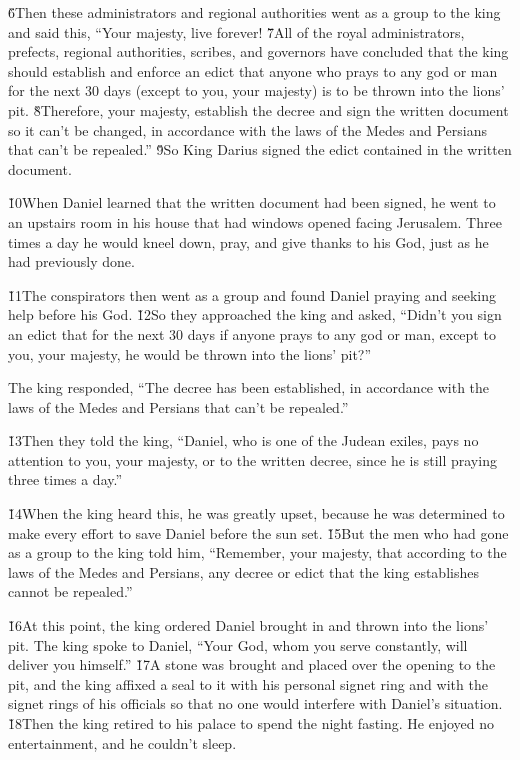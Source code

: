 \v{6}Then these administrators and regional authorities went as a group to the king and said this, ``Your majesty, live forever! \v{7}All of the royal administrators, prefects, regional authorities, scribes, and governors have concluded that the king should establish and enforce an edict that anyone who prays to any god or man for the next 30 days (except to you, your majesty) is to be thrown into the lions' pit. \v{8}Therefore, your majesty, establish the decree and sign the written document so it can't be changed, in accordance with the laws of the Medes and Persians that can't be repealed.'' \v{9}So King Darius signed the edict contained in the written document.

\v{10}When Daniel learned that the written document had been signed, he went to an upstairs room in his house that had windows opened facing Jerusalem. Three times a day he would kneel down, pray, and give thanks to his God, just as he had previously done.

\v{11}The conspirators then went as a group and found Daniel praying and seeking help before his God. \v{12}So they approached the king and asked, ``Didn't you sign an edict that for the next 30 days if anyone prays to any god or man, except to you, your majesty, he would be thrown into the lions' pit?''

The king responded, ``The decree has been established, in accordance with the laws of the Medes and Persians that can't be repealed.''

\v{13}Then they told the king, ``Daniel, who is one of the Judean exiles, pays no attention to you, your majesty, or to the written decree, since he is still praying three times a day.''

\v{14}When the king heard this, he was greatly upset, because he was determined to make every effort to save Daniel before the sun set. \v{15}But the men who had gone as a group to the king told him, ``Remember, your majesty, that according to the laws of the Medes and Persians, any decree or edict that the king establishes cannot be repealed.''

\v{16}At this point, the king ordered Daniel brought in and thrown into the lions' pit. The king spoke to Daniel, ``Your God, whom you serve constantly, will deliver you himself.'' \v{17}A stone was brought and placed over the opening to the pit, and the king affixed a seal to it with his personal signet ring and with the signet rings of his officials so that no one would interfere with Daniel's situation. \v{18}Then the king retired to his palace to spend the night fasting. He enjoyed no entertainment, and he couldn't sleep.


